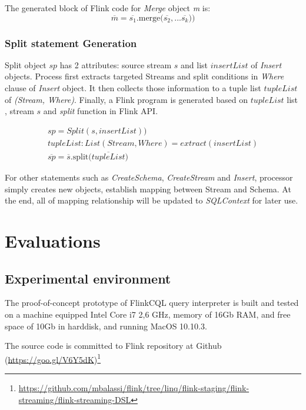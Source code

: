 The generated block of Flink code for \textit{Merge} object \textit{m} is:
\begin{equation}
	\overline{m} = \overline{s_1}\textrm{.merge(}\overline{s_2}, ...\overline{s_k} \textrm{))}
\end{equation}

\subsubsection*{Split statement Generation}

Split object $sp$ has 2 attributes: source stream $s$ and list $insertList$ of \textit{Insert} objects. Process first extracts targeted Streams and split conditions in \textit{Where} clause  of \textit{Insert} object. It then collects those information to a tuple list $tupleList$ of \textit{(Stream, Where)}. Finally, a Flink program is generated based on $tupleList$ list ,  stream $s$ and \textit{split} function in Flink API.

\begin{align}
	sp = Split(s, insertList)) \\
	tupleList: List(Stream, Where) = extract(insertList) \\
	\overline{sp} = \overline{s}\textrm{.split(}\overline{tupleList})
\end{align}

For other statements such as \textit{CreateSchema}, \textit{CreateStream} and \textit{Insert}, processor simply creates new objects, establish mapping between Stream and Schema. At the end, all of mapping relationship will be updated to \textit{SQLContext} for later use.

\section{Evaluations}
\subsection*{Experimental environment}
The proof-of-concept prototype of FlinkCQL query interpreter is built and tested on a machine equipped Intel Core i7 2,6 GHz, memory of 16Gb RAM, and free space of 10Gb in harddisk, and running MacOS 10.10.3.

The source code is committed to Flink repository at Github~ (\href{https://goo.gl/V6Y5dK}{https://goo.gl/V6Y5dK})\footnote{\href{https://github.com/mbalassi/flink/tree/linq/flink-staging/flink-streaming/flink-streaming-DSL}{https://github.com/mbalassi/flink/tree/linq/flink-staging/flink-streaming/flink-streaming-DSL}}


